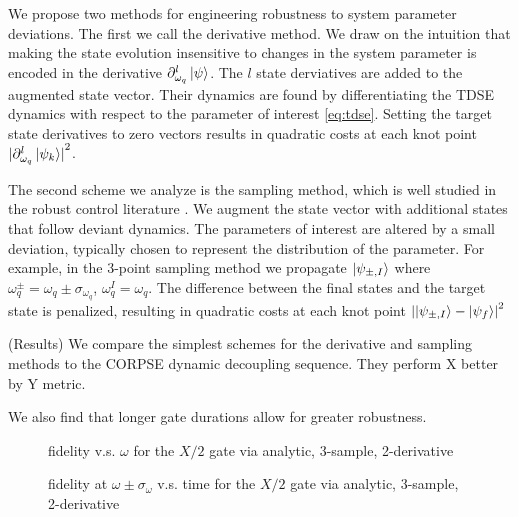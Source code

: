 \documentclass[
  amsfonts,
  amsmath,
  tbtags,
  amssymb,
  aps,
  nobibnotes,
  twocolumn,
]{revtex4-2}
\begin{document}
We propose two methods for engineering robustness
to system parameter deviations. The first we call the
derivative method. We draw on the intuition that
making the state evolution insensitive to changes
in the system parameter is encoded in the derivative
$\partial_{\omega_{q}}^{l} \ket{\psi}$.
The $l$ state derviatives are added to the augmented
state vector. Their dynamics are found by differentiating
the TDSE dynamics with respect to the parameter of interest
\ref{eq:tdse}. Setting the target state derivatives
to zero vectors results in quadratic costs at each
knot point
${\lvert \partial_{\omega_{q}}^{l} \ket{\psi_{k}} \rvert}^{2}$.

The second scheme we analyze is the sampling method,
which is well studied in the robust control literature
\cite{manchester2016derivative} \cite{tronarp2016sigma}.
We augment the state vector with additional
states that follow deviant dynamics. The parameters of interest
are altered by a small deviation, typically chosen
to represent the distribution of the parameter.
For example, in the 3-point sampling method we
propagate $\ket{\psi_{\pm, I}}$ where
$\omega_{q}^{\pm} = \omega_{q} \pm \sigma_{\omega_{q}}$,
$\omega_{q}^{I} = \omega_{q}$.
The difference between the final states and the target
state is penalized, resulting in quadratic costs at
each knot point
${\lvert \ket{\psi_{\pm, I}} - \ket{\psi_{f}} \rvert}^{2}$


(Results) We compare the simplest schemes
for the derivative and sampling methods to
the CORPSE dynamic decoupling sequence.
They perform X better by Y metric.

We also find that longer gate durations allow for
greater robustness.

\begin{figure}
  \caption{fidelity v.s. $\omega$ for the $X/2$ gate via
    analytic, 3-sample, 2-derivative}
\end{figure}

\begin{figure}
  \caption{fidelity at $\omega \pm \sigma_{\omega}$ v.s. time for the
    $X/2$ gate via analytic, 3-sample, 2-derivative}
\end{figure}
\end{document}
